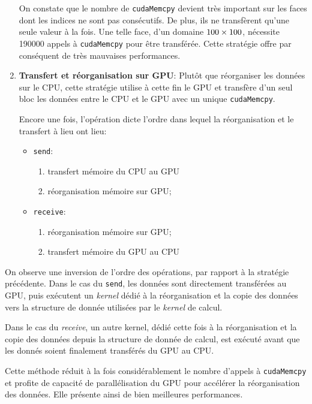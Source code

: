 \begin{enumerate}
On constate que le nombre de \texttt{cudaMemcpy} devient très important sur les faces dont les indices ne sont pas consécutifs. De plus, ils ne transfèrent qu'une seule valeur à la fois. Une telle face, d'un domaine $100\time100\times100$, nécessite 190000 appels à \texttt{cudaMemcpy} pour être transférée. 
Cette stratégie offre par conséquent de très mauvaises performances.

\item \textbf{Transfert et réorganisation sur \ac{GPU}}: Plutôt que réorganiser les données sur le \acs{CPU}, cette stratégie utilise à cette fin le \acs{GPU} et transfère d'un seul bloc les données entre le \acs{CPU} et le \acs{GPU} avec un unique \texttt{cudaMemcpy}.

Encore une fois, l'opération dicte l'ordre dans lequel la réorganisation et le transfert à lieu ont lieu:
\begin{itemize}
	\item \texttt{send}:
	\begin{enumerate}
		\item transfert mémoire du \acs{CPU} au \acs{GPU}
		\item réorganisation mémoire sur \acs{GPU};
	\end{enumerate}
	\item \texttt{receive}:
	\begin{enumerate}
		\item réorganisation mémoire sur \acs{GPU};
		\item transfert mémoire du \acs{GPU} au \acs{CPU}
	\end{enumerate}
\end{itemize}
\end{enumerate}

On observe une inversion de l'ordre des opérations, par rapport à la stratégie précédente. Dans le cas du \texttt{send}, les données sont directement transférées au \acs{GPU}, puis exécutent un \textit{kernel} dédié à la réorganisation et la copie des données vers la structure de donnée utilisées par le \textit{kernel} de calcul.

Dans le cas du \textit{receive}, un autre kernel, dédié cette fois à la réorganisation et la copie des données depuis la structure de donnée de calcul, est exécuté avant que les donnés soient finalement transférés du \acs{GPU} au \acs{CPU}.

Cette méthode réduit à la fois considérablement le nombre d'appels à \texttt{cudaMemcpy} et profite de capacité de parallélisation du \acs{GPU} pour accélérer la réorganisation des données. Elle présente ainsi de bien meilleures performances.


